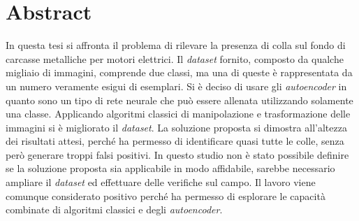 \chapter{Abstract}
In questa tesi si affronta il problema di rilevare la presenza di colla sul
fondo di carcasse metalliche per motori elettrici.
Il \textit{dataset} fornito, composto da qualche migliaio di immagini, comprende due classi, ma una di queste è rappresentata da un numero veramente esigui di esemplari.
Si è deciso di usare gli \textit{autoencoder} in quanto sono un tipo di rete neurale che può essere allenata utilizzando solamente una classe.
Applicando algoritmi classici di manipolazione e trasformazione delle immagini si è migliorato il \textit{dataset}.
La soluzione proposta si dimostra all'altezza dei risultati attesi, perché ha permesso di identificare quasi tutte le colle, senza però generare troppi falsi positivi.
In questo studio non è stato possibile definire se la soluzione proposta sia applicabile in modo affidabile, sarebbe necessario ampliare il \textit{dataset} ed effettuare delle verifiche sul campo.
Il lavoro viene comunque considerato positivo perché ha permesso di esplorare le capacità combinate di algoritmi classici e degli \textit{autoencoder}.


